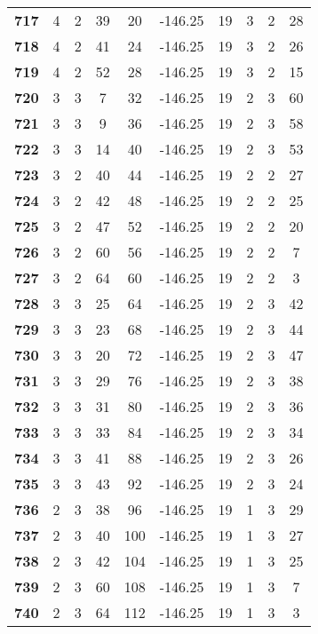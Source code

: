 \documentclass{article}%
\begin{document}
\begin{longtable}{cccccccccc}
        \textbf{717} & 4 & 2 & 39 & 20 & -146.25 & 19 & 3 & 2 & 28 \\ 
        \textbf{718} & 4 & 2 & 41 & 24 & -146.25 & 19 & 3 & 2 & 26 \\ 
        \textbf{719} & 4 & 2 & 52 & 28 & -146.25 & 19 & 3 & 2 & 15 \\ 
        \textbf{720} & 3 & 3 & 7 & 32 & -146.25 & 19 & 2 & 3 & 60 \\ 
        \textbf{721} & 3 & 3 & 9 & 36 & -146.25 & 19 & 2 & 3 & 58 \\ 
        \textbf{722} & 3 & 3 & 14 & 40 & -146.25 & 19 & 2 & 3 & 53 \\ 
        \textbf{723} & 3 & 2 & 40 & 44 & -146.25 & 19 & 2 & 2 & 27 \\ 
        \textbf{724} & 3 & 2 & 42 & 48 & -146.25 & 19 & 2 & 2 & 25 \\ 
        \textbf{725} & 3 & 2 & 47 & 52 & -146.25 & 19 & 2 & 2 & 20 \\ 
        \textbf{726} & 3 & 2 & 60 & 56 & -146.25 & 19 & 2 & 2 & 7 \\ 
        \textbf{727} & 3 & 2 & 64 & 60 & -146.25 & 19 & 2 & 2 & 3 \\ 
        \textbf{728} & 3 & 3 & 25 & 64 & -146.25 & 19 & 2 & 3 & 42 \\ 
        \textbf{729} & 3 & 3 & 23 & 68 & -146.25 & 19 & 2 & 3 & 44 \\ 
        \textbf{730} & 3 & 3 & 20 & 72 & -146.25 & 19 & 2 & 3 & 47 \\ 
        \textbf{731} & 3 & 3 & 29 & 76 & -146.25 & 19 & 2 & 3 & 38 \\ 
        \textbf{732} & 3 & 3 & 31 & 80 & -146.25 & 19 & 2 & 3 & 36 \\ 
        \textbf{733} & 3 & 3 & 33 & 84 & -146.25 & 19 & 2 & 3 & 34 \\ 
        \textbf{734} & 3 & 3 & 41 & 88 & -146.25 & 19 & 2 & 3 & 26 \\ 
        \textbf{735} & 3 & 3 & 43 & 92 & -146.25 & 19 & 2 & 3 & 24 \\ 
        \textbf{736} & 2 & 3 & 38 & 96 & -146.25 & 19 & 1 & 3 & 29 \\ 
        \textbf{737} & 2 & 3 & 40 & 100 & -146.25 & 19 & 1 & 3 & 27 \\ 
        \textbf{738} & 2 & 3 & 42 & 104 & -146.25 & 19 & 1 & 3 & 25 \\ 
        \textbf{739} & 2 & 3 & 60 & 108 & -146.25 & 19 & 1 & 3 & 7 \\ 
        \textbf{740} & 2 & 3 & 64 & 112 & -146.25 & 19 & 1 & 3 & 3 \\ 

\end{longtable}
\end{document}
